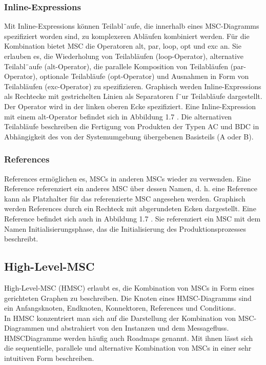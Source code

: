 \subsubsection{Inline-Expressions}
Mit Inline-Expressions können Teilabl¨aufe, die innerhalb
eines MSC-Diagramms spezifiziert worden sind, zu komplexeren
Abläufen kombiniert werden. Für die Kombination
bietet MSC die Operatoren alt, par, loop, opt und exc an. Sie erlauben es, die Wiederholung von Teilabläufen
(loop-Operator), alternative Teilabl¨aufe (alt-Operator), die
parallele Komposition von Teilabläufen (par-Operator), optionale
Teilabläufe (opt-Operator) und Ausnahmen in Form
von Teilabläufen (exc-Operator) zu spezifizieren. Graphisch
werden Inline-Expressions als Rechtecke mit gestrichelten
Linien als Separatoren f¨ur Teilabläufe dargestellt. Der Operator
wird in der linken oberen Ecke spezifiziert.
Eine Inline-Expression mit einem alt-Operator befindet
sich in Abbildung 1.7 . Die alternativen Teilabläufe beschreiben
die Fertigung von Produkten der Typen AC und BDC in
Abhängigkeit des von der Systemumgebung übergebenen
Basisteils (A oder B).\cite{MT009} \\
\subsubsection{References}
References ermöglichen es, MSCs in anderen MSCs wieder
zu verwenden. Eine Reference referenziert ein anderes
MSC über dessen Namen, d. h. eine Reference kann als
Platzhalter für das referenzierte MSC angesehen werden.
Graphisch werden References durch ein Rechteck mit abgerundeten
Ecken dargestellt. Eine Reference befindet sich
auch in Abbildung 1.7 . Sie referenziert ein MSC mit dem Namen
Initialisierungsphase, das die Initialisierung
des Produktionsprozesses beschreibt.\\
\subsection{High-Level-MSC}
High-Level-MSC (HMSC) erlaubt es, die Kombination von
MSCs in Form eines gerichteten Graphen zu beschreiben.
Die Knoten eines HMSC-Diagramms sind ein Anfangsknoten, Endknoten, Konnektoren, References und Conditions.
\\ In HMSC konzentriert man sich auf die Darstellung
der Kombination von MSC-Diagrammen und abstrahiert
von den Instanzen und dem Messagefluss. HMSCDiagramme
werden häufig auch Roadmaps genannt. Mit
ihnen lässt sich die sequentielle, parallele und alternative
Kombination von MSCs in einer sehr intuitiven Form beschreiben.\\

